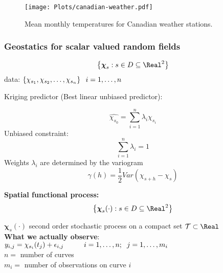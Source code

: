 

\frame
{
\begin{figure}
\begin{center}
\texttt{[image: Plots/canadian-weather.pdf]}
\caption{ Mean monthly temperatures for Canadian weather stations.}
\end{center}
\end{figure}
}


\frame
{
\frametitle{Geostatics for scalar valued random fields}
\[
	 \left\{ \boldsymbol\chi_s: s \in D  \subseteq \Real^2\right\} 
\] 
data: $\left\{ \chi_{s_1}, \chi_{s_2}, \dots, \chi_{s_n} \right\} \hspace{0.2cm} i = 1, \dots, n$

Kriging predictor (Best linear unbiased predictor):

\[
\widehat{\chi_{s_0}} = \sum_{i=1}^n \lambda_i \chi_{s_i}
\]
Unbiased constraint: 
\[
\sum_{i=1}^n \lambda_i = 1
\]
Weights $\lambda_i$ are determined by the variogram
\[
\gamma(h) = \frac{1}{2}Var(\chi_{s+h} -\chi_s)
\]
}

\frame
{
  \textbf{Spatial functional process:}\\
	\[
	 \left\{ \boldsymbol\chi_s(\cdot): s \in D  \subseteq \Real^2\right\} 
	 \] 
	 
	$\boldsymbol\chi_s(\cdot)$ second order stochastic process on a compact set $\mathcal{T} \subset \Real$\\[0.2cm]
	
	\textbf{What we actually observe}:\\[0.2cm]
	
	$y_{i,j} = \chi_{s_i}(t_j) + \epsilon_{i,j} \hspace{1cm} i = 1,\dots, n; \hspace{0.2cm} j = 1,\dots, m_i$\\[0.3cm]
	
	$n =$ number of curves\\
	$m_i=$ number of observations on curve $i$
}

